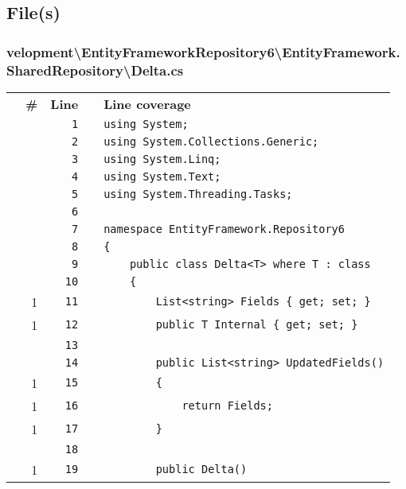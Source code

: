 \documentclass[a4paper,10pt]{article}
\begin{document}
\subsection{File(s)}
\subsubsection{velopment\textbackslash EntityFrameworkRepository6\textbackslash EntityFramework.SharedRepository\textbackslash Delta.cs}
\begin{longtable}[l]{lrrll}
\textbf{} & \textbf{\#} & \textbf{Line} & \textbf{} & \textbf{Line coverage}\\
\cellcolor{gray} &  & \verb~1~ & & \verb~using System;~\\
\cellcolor{gray} &  & \verb~2~ & & \verb~using System.Collections.Generic;~\\
\cellcolor{gray} &  & \verb~3~ & & \verb~using System.Linq;~\\
\cellcolor{gray} &  & \verb~4~ & & \verb~using System.Text;~\\
\cellcolor{gray} &  & \verb~5~ & & \verb~using System.Threading.Tasks;~\\
\cellcolor{gray} &  & \verb~6~ & & \verb~~\\
\cellcolor{gray} &  & \verb~7~ & & \verb~namespace EntityFramework.Repository6~\\
\cellcolor{gray} &  & \verb~8~ & & \verb~{~\\
\cellcolor{gray} &  & \verb~9~ & & \verb~    public class Delta<T> where T : class~\\
\cellcolor{gray} &  & \verb~10~ & & \verb~    {~\\
\cellcolor{green} & 1 & \verb~11~ & & \verb~        List<string> Fields { get; set; }~\\
\cellcolor{green} & 1 & \verb~12~ & & \verb~        public T Internal { get; set; }~\\
\cellcolor{gray} &  & \verb~13~ & & \verb~~\\
\cellcolor{gray} &  & \verb~14~ & & \verb~        public List<string> UpdatedFields()~\\
\cellcolor{green} & 1 & \verb~15~ & & \verb~        {~\\
\cellcolor{green} & 1 & \verb~16~ & & \verb~            return Fields;~\\
\cellcolor{green} & 1 & \verb~17~ & & \verb~        }~\\
\cellcolor{gray} &  & \verb~18~ & & \verb~~\\
\cellcolor{green} & 1 & \verb~19~ & & \verb~        public Delta()~\\

\end{longtable}
\end{document}
